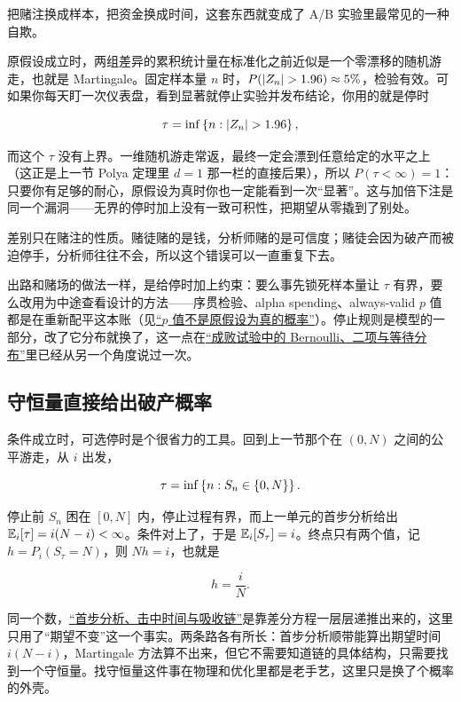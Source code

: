 把赌注换成样本，把资金换成时间，这套东西就变成了 A/B 实验里最常见的一种自欺。

原假设成立时，两组差异的累积统计量在标准化之前近似是一个零漂移的随机游走，也就是 Martingale。固定样本量 \(n\) 时，\(P(\abs{Z_n}>1.96)\approx5\%\)，检验有效。可如果你每天盯一次仪表盘，看到显著就停止实验并发布结论，你用的就是停时

\[
\tau=\inf\set{n:\abs{Z_n}>1.96},
\]

而这个 \(\tau\) 没有上界。一维随机游走常返，最终一定会漂到任意给定的水平之上（这正是上一节 Polya 定理里 \(d=1\) 那一栏的直接后果），所以 \(P(\tau<\infty)=1\)：只要你有足够的耐心，原假设为真时你也一定能看到一次``显著''。这与加倍下注是同一个漏洞——无界的停时加上没有一致可积性，把期望从零撬到了别处。

差别只在赌注的性质。赌徒赌的是钱，分析师赌的是可信度；赌徒会因为破产而被迫停手，分析师往往不会，所以这个错误可以一直重复下去。

出路和赌场的做法一样，是给停时加上约束：要么事先锁死样本量让 \(\tau\) 有界，要么改用为中途查看设计的方法——序贯检验、alpha spending、always-valid \(p\) 值都是在重新配平这本账（见\hyperref[sec:11-Mathematical-Statistics/05-Hypothesis-Testing/02]{``\(p\) 值不是原假设为真的概率''}）。停止规则是模型的一部分，改了它分布就换了，这一点在\hyperref[sec:05-Probability/06-Common-Distributions/01]{``成败试验中的 Bernoulli、二项与等待分布''}里已经从另一个角度说过一次。

\subsection{守恒量直接给出破产概率}

条件成立时，可选停时是个很省力的工具。回到上一节那个在 \((0,N)\) 之间的公平游走，从 \(i\) 出发，

\[
\tau=\inf\left\{n:S_n\in\left\{0,N\right\}\right\}.
\]

停止前 \(S_n\) 困在 \([0,N]\) 内，停止过程有界，而上一单元的首步分析给出 \(\mathbb{E}_i[\tau]=i(N-i)<\infty\)。条件对上了，于是 \(\mathbb{E}_i[S_\tau]=i\)。终点只有两个值，记 \(h=P_i(S_\tau=N)\)，则 \(Nh=i\)，也就是

\[
h=\frac iN.
\]

同一个数，\hyperref[sec:06-Random-Processes/03-Markov-Chains/05]{``首步分析、击中时间与吸收链''}是靠差分方程一层层递推出来的，这里只用了``期望不变''这一个事实。两条路各有所长：首步分析顺带能算出期望时间 \(i(N-i)\)，Martingale 方法算不出来，但它不需要知道链的具体结构，只需要找到一个守恒量。找守恒量这件事在物理和优化里都是老手艺，这里只是换了个概率的外壳。

